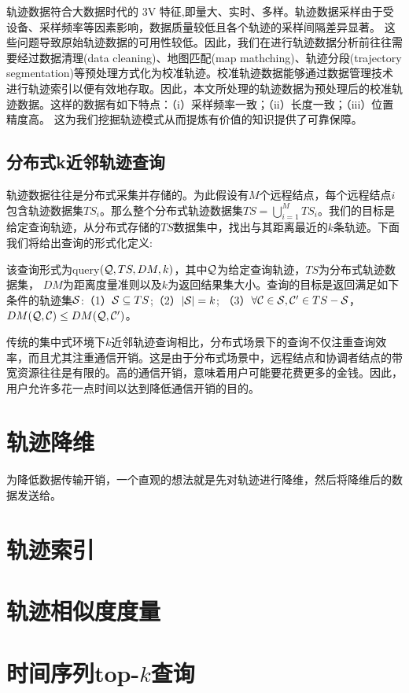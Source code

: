 轨迹数据符合大数据时代的 3V 特征,即量大、实时、多样。轨迹数据采样由于受设备、采样频率等因素影响，数据质量较低且各个轨迹的采样间隔差异显著。
这些问题导致原始轨迹数据的可用性较低。因此，我们在进行轨迹数据分析前往往需要经过数据清理(data cleaning)、地图匹配(map mathching)、轨迹分段(trajectory segmentation)等预处理方式化为校准轨迹。校准轨迹数据能够通过数据管理技术进行轨迹索引以便有效地存取。因此，本文所处理的轨迹数据为预处理后的校准轨迹数据。这样的数据有如下特点：（i）采样频率一致；（ii）长度一致；（iii）位置精度高。
这为我们挖掘轨迹模式从而提炼有价值的知识提供了可靠保障。

\subsection{分布式k近邻轨迹查询}
轨迹数据往往是分布式采集并存储的。为此假设有$M$个远程结点，每个远程结点$i$包含轨迹数据集$TS_{i}$。那么整个分布式轨迹数据集$TS=\bigcup_{i=1}^{M} TS_{i}$。我们的目标是给定查询轨迹，从分布式存储的$TS$数据集中，找出与其距离最近的$k$条轨迹。下面我们将给出查询的形式化定义:
\begin{define}[分布式k近邻轨迹查询]
	该查询形式为query$({\cal Q}, TS,DM,k)$，其中$\cal Q$为给定查询轨迹，$TS$为分布式轨迹数据集， $DM$为距离度量准则以及$k$为返回结果集大小。查询的目标是返回满足如下条件的轨迹集$\cal S$:（1）${\cal S} \subseteq TS$;（2）$| {\cal S}|=k$;
	（3）$\forall {\cal C} \in {\cal S}, {\cal C}' \in {TS - \cal S}$，$DM({\cal Q},{\cal C}) \le DM({\cal Q},{\cal C}')$。
\end{define}

传统的集中式环境下$k$近邻轨迹查询相比，分布式场景下的查询不仅注重查询效率，而且尤其注重通信开销。这是由于分布式场景中，远程结点和协调者结点的带宽资源往往是有限的。高的通信开销，意味着用户可能要花费更多的金钱。因此，用户允许多花一点时间以达到降低通信开销的目的。

\section{轨迹降维}\label{sec-c2-reduction}
为降低数据传输开销，一个直观的想法就是先对轨迹进行降维，然后将降维后的数据发送给。

\section{轨迹索引}\label{sec-c2-index}


\section{轨迹相似度度量}\label{sec-c2-measures}

\section{时间序列top-$k$查询}\label{sec-c2-topk}






\clearpage
\phantom{s}
\clearpage